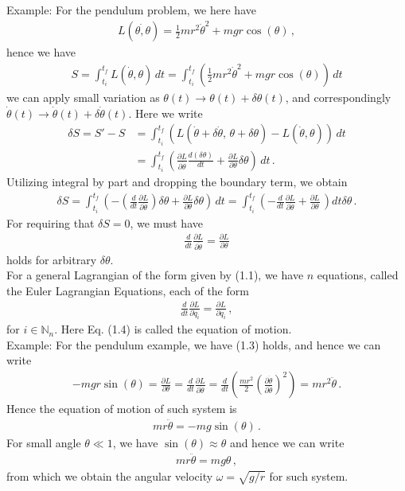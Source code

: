 \documentclass[11pt, onesided]{book}
\theoremstyle{break}
\theoremstyle{break}
\newcommand{\N}{\mathbb{N}}
\newcommand{\pd}{\partial}
\newcommand{\example}{\color{green}Example: \color{black}}
\begin{document}
\example For the pendulum problem, we here have
\begin{align*}
L(\dot{\theta,\theta}) =\frac{1}{2}mr^2 \dot{\theta}^2 + mgr \cos(\theta)\,,
\end{align*} 
hence we have 
\begin{align*}
S = \int_{t_i}^{t_f} L(\dot{\theta}, \theta) \, dt = \int_{t_i}^{t_f} \left(\frac{1}{2}mr^2 \dot{\theta}^2 + mgr \cos(\theta)\right) \, dt
\end{align*}
we can apply small variation as $\theta(t) \to \theta(t) + \delta \theta(t)$, and correspondingly $\dot{\theta}(t) \to \dot{\theta}(t)  + \delta \dot{\theta}(t)$. Here we write 
\begin{align*}
\delta S = S' - S 
&= \int_{t_i}^{t_f} \left(L(\dot{\theta}+\delta \dot{\theta}, \, \theta + \delta \theta) -L(\dot{\theta},\theta) \right)\, dt \\
&= \int_{t_i}^{t_f} \left( \frac{\pd L}{\pd \dot{\theta}} \frac{d(\delta \theta)}{dt} + \frac{\pd L}{\pd \theta}\delta \theta\right) \, dt\, .
\end{align*}
Utilizing integral by part and dropping the boundary term, we obtain
\begin{align*}
\delta S = \int_{t_i}^{t_f} \left( - \left(\frac{d}{dt}\frac{\pd L}{\pd \dot{\theta}}\right)\delta \theta + \frac{\pd L}{\pd \theta} \delta \theta \right) \, dt = \int_{t_i}^{t_f} \left( - \frac{d}{dt}\frac{\pd L}{\pd \dot{\theta}} + \frac{\pd L}{\pd \theta} \,  \right)dt \delta \theta \, .
\end{align*}
For requiring that $\delta S = 0$, we must have 
\begin{align}
 \frac{d}{dt} \frac{\pd L}{\pd \dot{\theta}} = \frac{\pd L}{\pd \theta}
\end{align}
 holds for arbitrary $\delta \theta$. \\
 
 For a general Lagrangian of the form given by (1.1), we have $n$ equations, called the Euler Lagrangian Equations, each of the form
 \begin{align}
 \frac{d}{dt}\frac{\pd L}{\pd \dot{q}_i} = \frac{\pd L}{\pd q_i}\,,
\end{align}   
 for $i\in \N_n$. Here Eq. (1.4) is called the equation of motion.\\
 

\example For the pendulum example, we have (1.3) holds, and hence we can write
\begin{align*}
-mgr \sin(\theta) =\frac{\pd L}{\pd \theta} =  \frac{d}{dt} \frac{\pd L}{\pd \dot{\theta}} =\frac{d}{dt}\left( \frac{mr^2}{2}\left( \frac{\pd \dot{\theta}}{\pd \dot{\theta}}\right)^2\right) = mr^2 \ddot{\theta}\,.
\end{align*}
Hence the equation of motion of such system is
\begin{align*}
 mr\ddot{\theta} = -mg\sin(\theta)\,.
\end{align*}
For small angle $\theta\ll 1$, we have $\sin(\theta) \approx \theta$ and hence we can write
\begin{align*}
 mr\ddot{\theta} = mg \theta\, ,
\end{align*}
from which we obtain the angular velocity $\omega = \sqrt{g/r}$ for such system. \\
\end{document}
